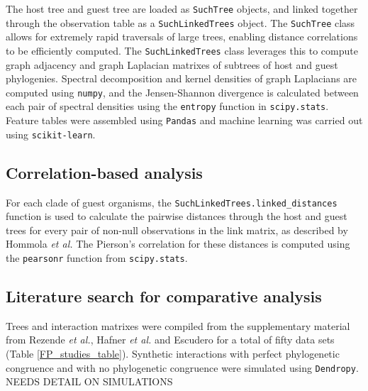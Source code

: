 The host tree and guest tree are loaded as {\tt SuchTree} objects, and linked together through the observation table as a {\tt SuchLinkedTrees} object. The {\tt SuchTree} class allows for extremely rapid traversals of large trees, enabling distance correlations to be efficiently computed. The {\tt SuchLinkedTrees} class leverages this to compute graph adjacency and graph Laplacian matrixes of subtrees of host and guest phylogenies. Spectral decomposition and kernel densities of graph Laplacians are computed using {\tt numpy}, and the Jensen-Shannon divergence is calculated between each pair of spectral densities using the {\tt entropy} function in {\tt scipy.stats}. \cite{walt2011numpy} Feature tables were assembled using {\tt Pandas} \cite{mckinney2010data} and machine learning was carried out using {\tt scikit-learn}. \cite{pedregosa2011scikit}

\subsection{Correlation-based analysis}

For each clade of guest organisms, the {\tt SuchLinkedTrees.linked\_distances} function is used to calculate the pairwise distances through the host and guest trees for every pair of non-null observations in the link matrix, as described by Hommola {\em et al.} \cite{hommola2009permutation} The Pierson's correlation for these distances is computed using the {\tt pearsonr} function from {\tt scipy.stats}. \cite{walt2011numpy}

\subsection{Literature search for comparative analysis}

Trees and interaction matrixes were compiled from the supplementary material from Rezende {\em et al.}, \cite{rezende2007non} Hafner {\em et al.} \cite{hafner1994disparate} and Escudero \cite{escudero2015phylogenetic} for a total of fifty data sets (Table \ref{FP_studies_table}). Synthetic interactions with perfect phylogenetic congruence and with no phylogenetic congruence were simulated using {\tt Dendropy}. \cite{sukumaran2010dendropy} NEEDS DETAIL ON SIMULATIONS